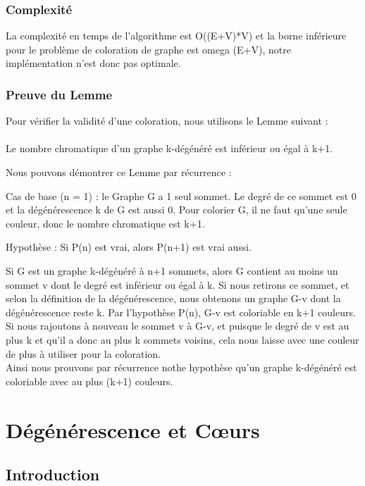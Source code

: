 \subsubsection{Complexité}

La complexité en temps de l'algorithme est O((E+V)*V) et la borne inférieure pour le problème de coloration de graphe est omega \Omega(E+V), notre implémentation n'est donc pas optimale.

\subsubsection{Preuve du Lemme}

Pour vérifier la validité d'une coloration, nous utilisons le Lemme suivant : \\
\\
Le nombre chromatique d'un graphe k-dégénéré est inférieur ou égal à k+1.

Nous pouvons démontrer ce Lemme par récurrence :

Cas de base (n = 1) : le Graphe G a 1 seul sommet. Le degré de ce sommet est 0 et la dégénérescence k de G est aussi 0. Pour colorier G, il ne faut qu'une seule couleur, donc le nombre chromatique est k+1.

Hypothèse : Si P(n) est vrai, alors P(n+1) est vrai aussi.

Si G est un graphe k-dégénéré à n+1 sommets, alors G contient au moins un sommet v dont le degré est inférieur ou égal à k. Si nous retirons ce sommet, et selon la définition de la dégénérescence, nous obtenons un graphe G-v dont la dégénérescence reste k. Par l'hypothèse P(n), G-v est coloriable en k+1 couleurs. \\ Si nous rajoutons à nouveau le sommet v à G-v, et puisque le degré de v est au plus k et qu'il a donc au plus k sommets voisins, cela nous laisse avec une couleur de plus à utiliser pour la coloration. \\
Ainsi nous prouvons par récurrence nothe hypothèse qu'un graphe k-dégénéré est coloriable avec au plus (k+1) couleurs.



\newpage

\section{Dégénérescence et Cœurs }
\subsection{Introduction}
\label{sec:Degenerescence_et_Cœurs_introduction}

